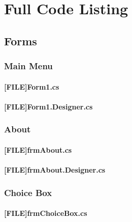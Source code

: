 \chapter{Full Code Listing}
\label{chap:fullCodeListing}

\section{Forms}

\subsection{Main Menu}
\subsubsection{[FILE]Form1.cs}

\subsubsection{[FILE]Form1.Designer.cs}


\subsection{About}
\subsubsection{[FILE]frmAbout.cs}

\subsubsection{[FILE]frmAbout.Designer.cs}


\subsection{Choice Box}
\subsubsection{[FILE]frmChoiceBox.cs}

